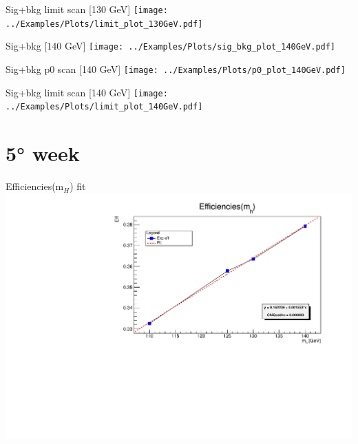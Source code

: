 \documentclass[10pt,UKenglish, leqno, xcolor = dvipsnames]{beamer}
\begin{document}
		\begin{frame}{Sig+bkg limit scan [130 GeV]}
			\vfill
			\texttt{[image: ../Examples/Plots/limit\_plot\_130GeV.pdf]}
			\vfill
		\end{frame}
	
		\begin{frame}{Sig+bkg [140 GeV]}
			\vfill
			\texttt{[image: ../Examples/Plots/sig\_bkg\_plot\_140GeV.pdf]}
			\vfill
		\end{frame}
		
		\begin{frame}{Sig+bkg p0 scan [140 GeV]}
			\vfill
			\texttt{[image: ../Examples/Plots/p0\_plot\_140GeV.pdf]}
			\vfill
		\end{frame}
		
		\begin{frame}{Sig+bkg limit scan [140 GeV]}
			\vfill
			\texttt{[image: ../Examples/Plots/limit\_plot\_140GeV.pdf]}
			\vfill
		\end{frame}
	
	\section{5° week}
	\SectionPage
		
		\begin{frame}{Efficiencies(m$_H$) fit}
			\vfill
			\includegraphics[width=1.\textwidth]{../images/efficiencies_fit.pdf}
			\vfill
		\end{frame}
	
\end{document}
